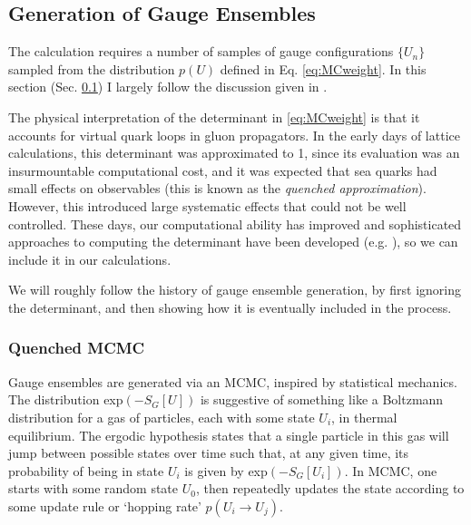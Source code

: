 \subsection{Generation of Gauge Ensembles}
\label{sec:MCMC}

The calculation requires a number of samples of gauge configurations $\{U_n\}$ sampled from the distribution $p(U)$ defined in Eq. \eqref{eq:MCweight}. In this section (Sec. \ref{sec:MCMC}) I largely follow the discussion given in \cite{DeGrand:2006zz}.

The physical interpretation of the determinant in \eqref{eq:MCweight} is that it accounts for virtual quark loops in gluon propagators. In the early days of lattice calculations, this determinant was approximated to 1, since its evaluation was an insurmountable computational cost, and it was expected that sea quarks had small effects on observables (this is known as the {\it{quenched approximation}}). However, this introduced large systematic effects that could not be well controlled. These days, our computational ability has improved and sophisticated approaches to computing the determinant have been developed (e.g. \cite{PhysRevD.35.2531}), so we can include it in our calculations.

We will roughly follow the history of gauge ensemble generation, by first ignoring the determinant, and then showing how it is eventually included in the process.

\subsubsection{Quenched MCMC}

Gauge ensembles are generated via an MCMC, inspired by statistical mechanics. The distribution exp$(-S_G[U])$ is suggestive of something like a Boltzmann distribution for a gas of particles, each with some state $U_i$, in thermal equilibrium. The ergodic hypothesis states that a single particle in this gas will jump between possible states over time such that, at any given time, its probability of being in state $U_i$ is given by exp$(-S_G[U_i])$. In MCMC, one starts with some random state $U_0$, then repeatedly updates the state according to some update rule or `hopping rate' $p(U_i\to U_j)$. 

